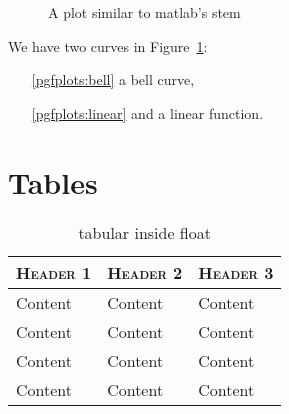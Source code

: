 \documentclass[a4paper,11pt,oneside,showtrims]{alpenthesis}
\begin{document}
\begin{figure}[htb]
    \caption{A plot similar to matlab's stem}
    \label{fig:stem}
\end{figure}

We have two curves in Figure~\ref{fig:stem}:
\begin{itemize}\tightlist
    \item[\ref{pgfplots:bell}] a bell curve,
    \item[\ref{pgfplots:linear}] and a linear function.
\end{itemize}
\lipsum[2]

\chapter{Tables} %
\begin{table}
    \centering
    \caption{tabular inside float}
    \label{tab:float}
    \begin{tabular}{lll}
        \toprule
        \scshape Header 1 & \scshape Header 2 & \scshape Header 3 \\
        \midrule
        Content           & Content           & Content           \\
        Content           & Content           & Content           \\
        Content           & Content           & Content           \\
        Content           & Content           & Content           \\
        \bottomrule
    \end{tabular}
\end{table}

\lipsum[3]
\end{document}
